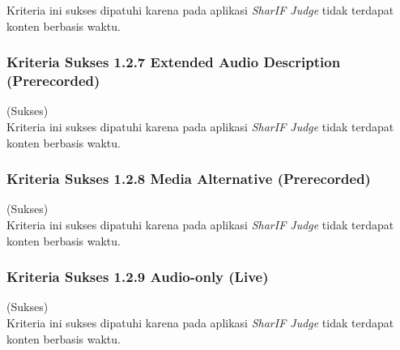 Kriteria ini sukses dipatuhi karena pada aplikasi \textit{SharIF Judge} tidak terdapat konten berbasis waktu.

\subsubsection{Kriteria Sukses 1.2.7 Extended Audio Description (Prerecorded)}
\label{subsubsec:kepatuhan_kriteria_1.2.7}
(Sukses) \\

Kriteria ini sukses dipatuhi karena pada aplikasi \textit{SharIF Judge} tidak terdapat konten berbasis waktu.

\subsubsection{Kriteria Sukses 1.2.8 Media Alternative (Prerecorded)}
\label{subsubsec:kepatuhan_kriteria_1.2.8}
(Sukses) \\

Kriteria ini sukses dipatuhi karena pada aplikasi \textit{SharIF Judge} tidak terdapat konten berbasis waktu.

\subsubsection{Kriteria Sukses 1.2.9 Audio-only (Live)}
\label{subsubsec:kepatuhan_kriteria_1.2.9}
(Sukses) \\

Kriteria ini sukses dipatuhi karena pada aplikasi \textit{SharIF Judge} tidak terdapat konten berbasis waktu.
